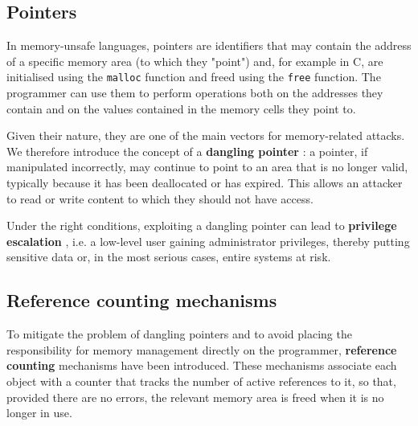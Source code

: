 \subsection{Pointers}\label{pointers}
In memory-unsafe languages, pointers are identifiers that may contain the address of a specific memory area (to which they "point") and, for example in C, are initialised using the \texttt{malloc} function and freed using the \texttt{free} function. The programmer can use them to perform operations both on the addresses they contain and on the values contained in the memory cells they point to.

Given their nature, they are one of the main vectors for memory-related attacks. We therefore introduce the concept of a \textbf{dangling pointer} \cite{bib:dangling-pointer}: a pointer, if manipulated incorrectly, may continue to point to an area that is no longer valid, typically because it has been deallocated or has expired. This allows an attacker to read or write content to which they should not have access.

\begin{listing}[H]
\end{listing}

\noindent Under the right conditions, exploiting a dangling pointer can lead to \textbf{privilege escalation} \cite{bib:privilege-escalation}, i.e. a low-level user gaining administrator privileges, thereby putting sensitive data or, in the most serious cases, entire systems at risk.

\subsection{Reference counting mechanisms}\label{sec:refcount}
To mitigate the problem of dangling pointers and to avoid placing the responsibility for memory management directly on the programmer, \textbf{reference counting} \cite{bib:refcount} mechanisms have been introduced. These mechanisms associate each object with a counter that tracks the number of active references to it, so that, provided there are no errors, the relevant memory area is freed when it is no longer in use.

\begin{listing}[H]
\end{listing}

